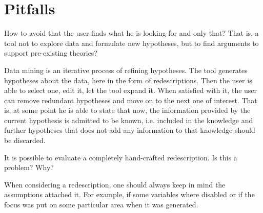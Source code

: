 \documentclass{llncs}
\newcommand{\Siren}{\textsc{Siren}}
\newcommand{\ReReMi}{\textsc{ReReMi}}
\begin{document}

\section{Pitfalls}
How to avoid that the user finds what he is looking for and only that?
That is, a tool not to explore data and formulate new hypotheses, but to find arguments to support pre-existing theories?

Data mining is an iterative process of refining hypotheses. The tool generates hypotheses about the data, here in the form of redescriptions. Then the user is able to select one, edit it, let the tool expand it. When satisfied with it, the user can remove redundant hypotheses and move on to the next one of interest. That is, at some point he is able to state that now, the information provided by the current hypothesis is admitted to be known, i.e. included in the knowledge and further hypotheses that does not add any information to that knowledge should be discarded.

It is possible to evaluate a completely hand-crafted redescription. Is this a problem? Why?

When considering a redescription, one should always keep in mind the assumptions attached it. For example, if some variables where disabled or if the focus was put on some particular area when it was generated.
\end{document}
